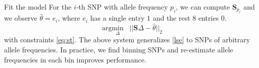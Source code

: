 \documentclass[]{beamer}
\def\S{{\mathbf{S}}}
\begin{document}
\begin{frame}{Fit the model}
For the $i$-th SNP with allele frequency $p_i$, we can compute $\S_{p_i}$ and we observe $\hat{\theta}=e_i$, where $e_i$ has a single entry $1$ and the rest $8$ entries $0$.  %
\begin{equation} \label{lse2}
{\text{arg} \min_\Delta\;\;}  ||\S \Delta - \hat\theta ||_2  %
\end{equation}
with constraints \eqref{eq:st}. The above system generalizes \eqref{lse} to SNPs of arbitrary allele frequencies.  In practice, we find binning SNPs and re-estimate allele frequencies in each bin improves performance. 

\end{frame}
\end{document}
